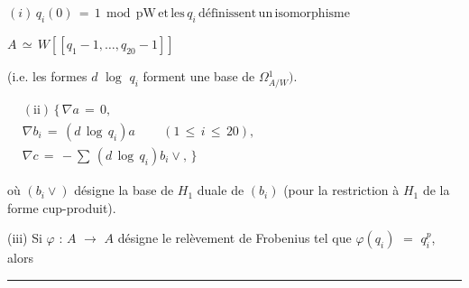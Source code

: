 \documentclass[9pt]{article}
\newcommand{\CanonText}[1]{\par{\fontsize{8.0}{9.35}\selectfont\RaggedRight #1\par}\vspace{2.2pt}}
\newcommand{\CanonDisplay}[1]{\par\vspace{1.2pt}\begin{center}{\fontsize{7.2}{8.4}\selectfont\(\displaystyle #1\)}\end{center}\vspace{1.2pt}}
\newenvironment{CanonMathBlock}{\par\vspace{1.2pt}\begin{center}\fontsize{6.8}{8.0}\selectfont\(\displaystyle}{\)\end{center}\vspace{1.2pt}}
\begin{document}
\begin{minipage}[t][\dimexpr\textheight-5pt\relax][t]{\textwidth}
\CanonDisplay{(i)\,q_{i}(0)\,=\,1\,\operatorname{mod}\,\text{pW}\,\mathrm{et}\,\text{les}\,q_{i}\,\text{définissent}\,\text{un}\,\text{isomorphisme}}
\CanonDisplay{A\,\simeq{}\,W[[q_{1}-1,\ldots{},q_{20}-1]]}
\CanonText{(i.e. les formes \(d\) \(\operatorname{log}\) \(q_{i}\) forment une base de \(\Omega{}^{1}_{A/W})\).}
\begin{CanonMathBlock}
\begin{aligned}
& (\text{ii})\,\lbrace{}\,\nabla{}a\,=\,0,\\
& \nabla{}b_{i}\,=\,(d\,\operatorname{log}\,q_{i})a\qquad\,(1\,\leq{}\,i\,\leq{}\,20),\\
& \nabla{}c\,=\,-\sum{}\,(d\,\operatorname{log}\,q_{i})b_{i}\vee{},\,\rbrace{}
\end{aligned}
\end{CanonMathBlock}
\CanonText{où \((b_{i}\vee{})\) désigne la base de \(H_{1}\) duale de \((b_{i})\) (pour la restriction à \(H_{1}\) de la forme cup-produit).}
\CanonText{(iii) Si \(\varphi{}\) : \(A\) \(\to{}\) \(A\) désigne le relèvement de Frobenius tel que \(\varphi{}(q_{i})\) \(=\) \(q_{i}^{p}\), alors}
\vfill
{\color{Accent}\hrule height 0.35pt}\vspace{3pt}
\end{minipage}
\newpage
\end{document}
